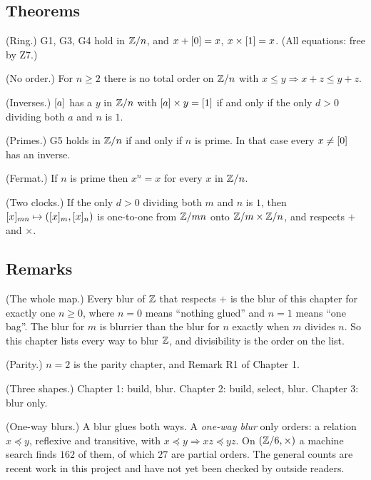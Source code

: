\subsection*{Theorems}

\begin{lines}
\item[\lab{T1}] (Ring.) G1, G3, G4 hold in $\mathbb{Z}/n$, and $x + [0] = x$, $x \times [1] = x$. (All equations: free by Z7.)
\item[\lab{T2}] (No order.) For $n \ge 2$ there is no total order on $\mathbb{Z}/n$ with $x \le y \Rightarrow x + z \le y + z$.
\item[\lab{T3}] (Inverses.) $[a]$ has a $y$ in $\mathbb{Z}/n$ with $[a] \times y = [1]$ if and only if the only $d > 0$ dividing both $a$ and $n$ is $1$.
\item[\lab{T4}] (Primes.) G5 holds in $\mathbb{Z}/n$ if and only if $n$ is prime. In that case every $x \neq [0]$ has an inverse.
\item[\lab{T5}] (Fermat.) If $n$ is prime then $x^n = x$ for every $x$ in $\mathbb{Z}/n$.
\item[\lab{T6}] (Two clocks.) If the only $d > 0$ dividing both $m$ and $n$ is $1$, then $[x]_{mn} \mapsto ([x]_m, [x]_n)$ is one-to-one from $\mathbb{Z}/mn$ onto $\mathbb{Z}/m \times \mathbb{Z}/n$, and respects $+$ and $\times$.
\end{lines}

\subsection*{Remarks}

\begin{lines}
\item[\lab{R1}] (The whole map.) Every blur of $\mathbb{Z}$ that respects $+$ is the blur of this chapter for exactly one $n \ge 0$, where $n = 0$ means ``nothing glued'' and $n = 1$ means ``one bag''. The blur for $m$ is blurrier than the blur for $n$ exactly when $m$ divides $n$. So this chapter lists every way to blur $\mathbb{Z}$, and divisibility is the order on the list.
\item[\lab{R2}] (Parity.) $n = 2$ is the parity chapter, and Remark R1 of Chapter 1.
\item[\lab{R3}] (Three shapes.) Chapter 1: build, blur. Chapter 2: build, select, blur. Chapter 3: blur only.
\item[\lab{R4}] (One-way blurs.) A blur glues both ways. A \emph{one-way blur} only orders: a relation $x \preceq y$, reflexive and transitive, with $x \preceq y \Rightarrow xz \preceq yz$. On $(\mathbb{Z}/6, \times)$ a machine search finds $162$ of them, of which $27$ are partial orders. The general counts are recent work in this project and have not yet been checked by outside readers.
\end{lines}

